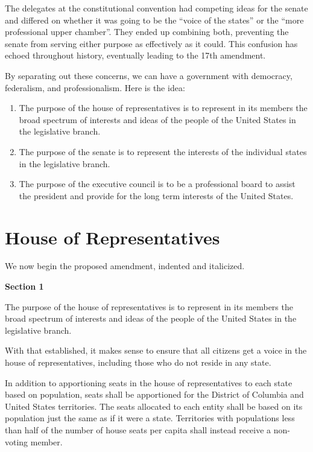 \documentclass{article}
\begin{document}
The delegates at the constitutional convention had competing ideas for the senate and differed on whether it was going to be the “voice of the states” or the “more professional upper chamber”. They ended up combining both, preventing the senate from serving either purpose as effectively as it could. This confusion has echoed throughout history, eventually leading to the 17th amendment.

By separating out these concerns, we can have a government with democracy, federalism, and professionalism. Here is the idea:
\begin{enumerate}[I]
\item The purpose of the house of representatives is to represent in its members the broad spectrum of interests and ideas of the people of the United States in the legislative branch.
\item The purpose of the senate is to represent the interests of the individual states in the legislative branch.
\item The purpose of the executive council is to be a professional board to assist the president and provide for the long term interests of the United States.
\end{enumerate}

\section{House of Representatives}

We now begin the proposed amendment, indented and italicized.

\begin{quoting}
\textbf{Section 1}

The purpose of the house of representatives is to represent in its members the broad spectrum of interests and ideas of the people of the United States in the legislative branch.
\end{quoting}

With that established, it makes sense to ensure that all citizens get a voice in the house of representatives, including those who do not reside in any state.

\begin{quoting}
In addition to apportioning seats in the house of representatives to each state based on population, seats shall be apportioned for the District of Columbia and United States territories. The seats allocated to each entity shall be based on its population just the same as if it were a state. Territories with populations less than half of the number of house seats per capita shall instead receive a non-voting member.
\end{quoting}
\end{document}

